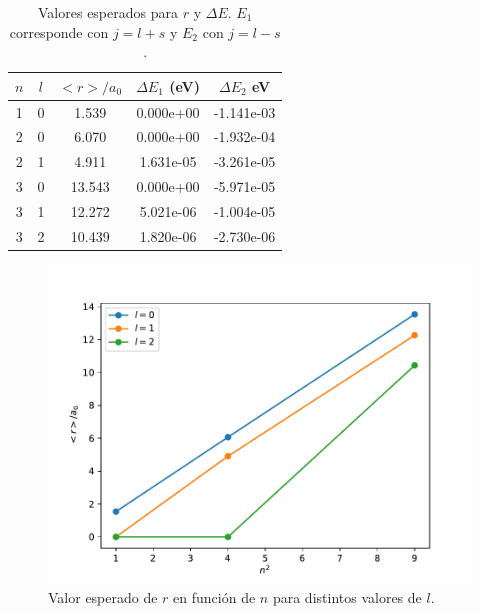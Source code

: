 \documentclass[paper=letter, fontsize=11pt]{scrartcl}
\begin{document}
\begin{table}[h]
	\centering
	\caption{Valores esperados para $r$ y $\Delta E$. $E_1$ corresponde con $j=l+s$ y $E_2$ con $j=l-s$.}
	\begin{tabular}{ccccc}
		\hline
		$n$ & $l$ & $<r>/a_0$ & $\Delta E_1$ (eV) & $\Delta E_2$ eV \\
		\hline
		1 & 0 & 1.539 & 0.000e+00 & -1.141e-03 \\
		2 & 0 & 6.070 & 0.000e+00 & -1.932e-04 \\
		2 & 1 & 4.911 & 1.631e-05 & -3.261e-05 \\
		3 & 0 & 13.543 & 0.000e+00 & -5.971e-05 \\
		3 & 1 & 12.272 & 5.021e-06 & -1.004e-05 \\
		3 & 2 & 10.439 & 1.820e-06 & -2.730e-06 \\
		\hline
	\end{tabular}
	\label{tb: table}
\end{table}

\begin{figure}[ht]
	\centering
	\includegraphics[width=\linewidth]{radius.pdf}
	\caption{Valor esperado de $r$ en funci\'on de $n$ para distintos valores de $l$.}
	\label{fig:functions}
\end{figure}
\end{document}

